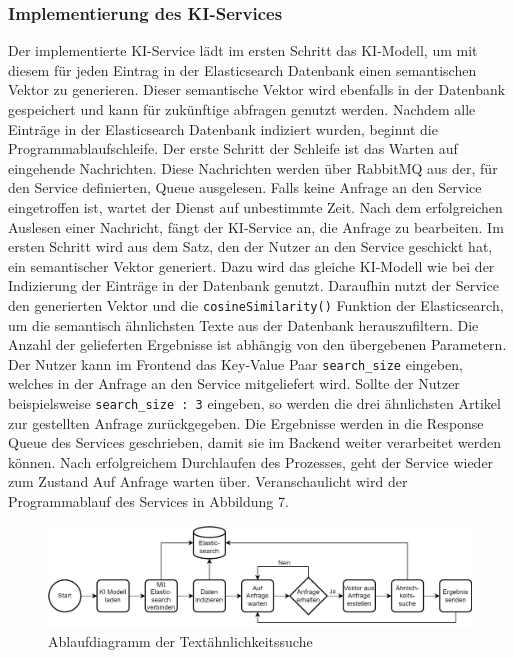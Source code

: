 \subsubsection{Implementierung des KI-Services}
Der implementierte KI-Service lädt im ersten Schritt das KI-Modell, um mit diesem für jeden Eintrag in der Elasticsearch Datenbank einen semantischen Vektor zu generieren. Dieser semantische Vektor wird ebenfalls in der Datenbank gespeichert und kann für zukünftige abfragen genutzt werden.
Nachdem alle Einträge in der Elasticsearch Datenbank indiziert wurden, beginnt die Programmablaufschleife. Der erste Schritt der Schleife ist das Warten auf eingehende Nachrichten. Diese Nachrichten werden über RabbitMQ aus der, für den Service definierten, Queue ausgelesen. Falls keine Anfrage an den Service eingetroffen ist, wartet der Dienst auf unbestimmte Zeit. Nach dem erfolgreichen Auslesen einer Nachricht, fängt der KI-Service an, die Anfrage zu bearbeiten. Im ersten Schritt wird aus dem Satz, den der Nutzer an den Service geschickt hat, ein semantischer Vektor generiert. Dazu wird das gleiche KI-Modell wie bei der Indizierung der Einträge in der Datenbank genutzt. Daraufhin nutzt der Service den generierten Vektor und die \texttt{cosineSimilarity()} Funktion der Elasticsearch, um die semantisch ähnlichsten Texte aus der Datenbank herauszufiltern. Die Anzahl der gelieferten Ergebnisse ist abhängig von den übergebenen Parametern. Der Nutzer kann im Frontend das Key-Value Paar \texttt{search\_{}size} eingeben, welches in der Anfrage an den Service mitgeliefert wird. Sollte der Nutzer beispielsweise \texttt{\glqq search\_{}size : 3\grqq{}} eingeben, so werden die drei ähnlichsten Artikel zur gestellten Anfrage zurückgegeben. Die Ergebnisse werden in die Response Queue des Services geschrieben, damit sie im Backend weiter verarbeitet werden können. Nach erfolgreichem Durchlaufen des Prozesses, geht der Service wieder zum Zustand \glqq Auf Anfrage warten\grqq{} über. Veranschaulicht wird der Programmablauf des Services in Abbildung 7.

\begin{figure}[H]
  \centering
    \includegraphics[width = 15cm]{bilder/KIAblauf}
    \caption{Ablaufdiagramm der Textähnlichkeitssuche}
\end{figure}

